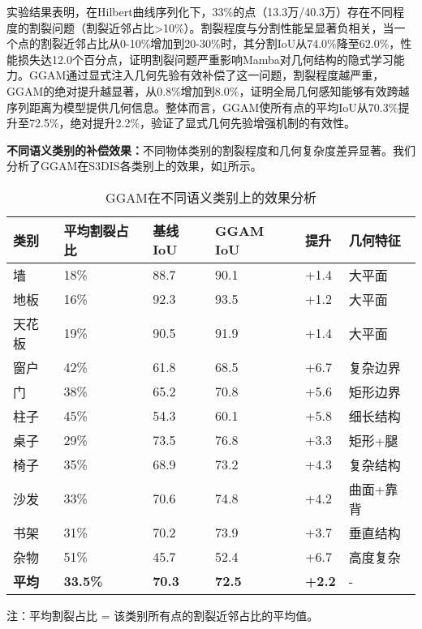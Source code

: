 \documentclass[preprint,12pt]{elsarticle}
\begin{document}
实验结果表明，在Hilbert曲线序列化下，33\%的点（13.3万/40.3万）存在不同程度的割裂问题（割裂近邻占比>10\%）。割裂程度与分割性能呈显著负相关，当一个点的割裂近邻占比从0-10\%增加到20-30\%时，其分割IoU从74.0\%降至62.0\%，性能损失达12.0个百分点，证明割裂问题严重影响Mamba对几何结构的隐式学习能力。GGAM通过显式注入几何先验有效补偿了这一问题，割裂程度越严重，GGAM的绝对提升越显著，从0.8\%增加到8.0\%，证明全局几何感知能够有效跨越序列距离为模型提供几何信息。整体而言，GGAM使所有点的平均IoU从70.3\%提升至72.5\%，绝对提升2.2\%，验证了显式几何先验增强机制的有效性。



\textbf{不同语义类别的补偿效果：}不同物体类别的割裂程度和几何复杂度差异显著。我们分析了GGAM在S3DIS各类别上的效果，如\cref{tab:ggam_per_class}所示。

\begin{table}[htbp!]
	\centering
	\caption{GGAM在不同语义类别上的效果分析}
	\label{tab:ggam_per_class}
	\begin{tabular}{@{}llllll@{}}
		\toprule
		类别 & 平均割裂占比 & 基线IoU & GGAM IoU & 提升 & 几何特征 \\ 
		\midrule
		墙 & 18\% & 88.7 & 90.1 & +1.4 & 大平面 \\
		地板 & 16\% & 92.3 & 93.5 & +1.2 & 大平面 \\
		天花板 & 19\% & 90.5 & 91.9 & +1.4 & 大平面 \\
		\midrule
		窗户 & 42\% & 61.8 & 68.5 & +6.7 & 复杂边界 \\
		门 & 38\% & 65.2 & 70.8 & +5.6 & 矩形边界 \\
		柱子 & 45\% & 54.3 & 60.1 & +5.8 & 细长结构 \\
		\midrule
		桌子 & 29\% & 73.5 & 76.8 & +3.3 & 矩形+腿 \\
		椅子 & 35\% & 68.9 & 73.2 & +4.3 & 复杂结构 \\
		沙发 & 33\% & 70.6 & 74.8 & +4.2 & 曲面+靠背 \\
		书架 & 31\% & 70.2 & 73.9 & +3.7 & 垂直结构 \\
		杂物 & 51\% & 45.7 & 52.4 & +6.7 & 高度复杂 \\
		\midrule
		\textbf{平均} & \textbf{33.5\%} & \textbf{70.3} & \textbf{72.5} & \textbf{+2.2} & - \\
		\bottomrule
	\end{tabular}
\end{table}
注：平均割裂占比 = 该类别所有点的割裂近邻占比的平均值。
\end{document}
